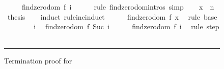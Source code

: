 \begin{isabellebody}
\begin{figure}
\begin{minipage}{0.8\textwidth}
\ \ \ \ {}\ findzero{}dom\ {}f{}\ i{}{}\isanewline
\ \ \ \ \isamarkupfalse%
\ {}rule\ findzero{}domintros{}\ simp\isanewline
\isanewline
\ \ \isamarkupfalse%
\ {}x\ {}\ n{}\ \isamarkupfalse%
\ {}thesis\isanewline
\ \ \isamarkupfalse%
\ {}induct\ rule{}inc{}induct{}\isanewline
\ \ \ \ \isamarkupfalse%
\ {}findzero{}dom\ {}f{}\ x{}{}\ \isamarkupfalse%
\ {}rule\ base{}\isanewline
\ \ \isamarkupfalse%
\isanewline
\ \ \ \ \isamarkupfalse%
\ i\ \isamarkupfalse%
\ {}findzero{}dom\ {}f{}\ Suc\ i{}{}\isanewline
\ \ \ \ \isamarkupfalse%
\ {}findzero{}dom\ {}f{}\ i{}{}\ \isamarkupfalse%
\ {}rule\ step{}\isanewline
\ \ \isamarkupfalse%
\isanewline
{}\isamarkupfalse%
%
\endisatagproof
{\isafoldproof}%
%
\isadelimproof
%
\endisadelimproof
%
\isamarkupfalse{}
\end{minipage}\vspace{6pt}\hrule
\caption{Termination proof for }\label{findzero_term}
\end{figure}

\end{isabellebody}
